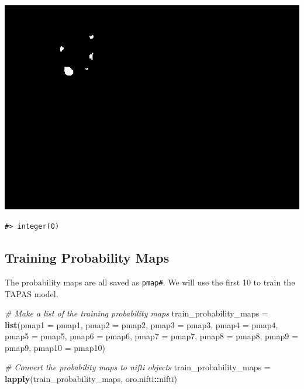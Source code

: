 \documentclass[]{article}
\newenvironment{Shaded}{\begin{snugshade}}{\end{snugshade}}
\newcommand{\CommentTok}[1]{\textcolor[rgb]{0.56,0.35,0.01}{\textit{#1}}}
\newcommand{\DataTypeTok}[1]{\textcolor[rgb]{0.13,0.29,0.53}{#1}}
\newcommand{\KeywordTok}[1]{\textcolor[rgb]{0.13,0.29,0.53}{\textbf{#1}}}
\newcommand{\NormalTok}[1]{#1}
\newcommand{\OperatorTok}[1]{\textcolor[rgb]{0.81,0.36,0.00}{\textbf{#1}}}
\newcommand{\StringTok}[1]{\textcolor[rgb]{0.31,0.60,0.02}{#1}}
\begin{document}
\includegraphics{tapas-vignette_files/figure-latex/unnamed-chunk-9-10.pdf}

\begin{verbatim}
#> integer(0)
\end{verbatim}

\hypertarget{training-probability-maps}{%
\subsection{Training Probability Maps}\label{training-probability-maps}}

The probability maps are all saved as \texttt{pmap\#}. We will use the
first 10 to train the TAPAS model.

\begin{Shaded}
\begin{Highlighting}[]
\CommentTok{# Make a list of the training probability maps}
\NormalTok{train_probability_maps =}\StringTok{ }\KeywordTok{list}\NormalTok{(}\DataTypeTok{pmap1 =}\NormalTok{ pmap1, }
                              \DataTypeTok{pmap2 =}\NormalTok{ pmap2, }
                              \DataTypeTok{pmap3 =}\NormalTok{ pmap3, }
                              \DataTypeTok{pmap4 =}\NormalTok{ pmap4, }
                              \DataTypeTok{pmap5 =}\NormalTok{ pmap5, }
                              \DataTypeTok{pmap6 =}\NormalTok{ pmap6, }
                              \DataTypeTok{pmap7 =}\NormalTok{ pmap7, }
                              \DataTypeTok{pmap8 =}\NormalTok{ pmap8, }
                              \DataTypeTok{pmap9 =}\NormalTok{ pmap9, }
                              \DataTypeTok{pmap10 =}\NormalTok{ pmap10)}

\CommentTok{# Convert the probability maps to nifti objects}
\NormalTok{train_probability_maps =}\StringTok{ }\KeywordTok{lapply}\NormalTok{(train_probability_maps, oro.nifti}\OperatorTok{::}\NormalTok{nifti)}
\end{Highlighting}
\end{Shaded}
\end{document}
